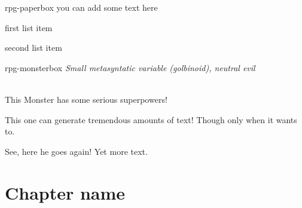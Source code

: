 \documentclass[10pt,twoside,twocolumn]{book}
\begin{document}
\begin{rpg-paperbox}{rpg-paperbox}
	you can add some text here
\end{rpg-paperbox}

\begin{rpg-list}
    \item first list item
    \item second list item
\end{rpg-list}
\begin{rpg-monsterbox}{rpg-monsterbox}
	\textit{Small metasyntatic variable (golbinoid), neutral evil}\\
	\hline
	\basics[%
	armorclass = 12,
	hitpoints  = 16 (3d8 + 3),
	speed      = 50 t
	]
	\hline
	\stats[ %
    STR = 12, 
    DEX = 7
	]
	\hline
	\details[%
	languages = {Common Lisp, Erlang},
	]
	\hline \\[1mm]
	\begin{rpg-monsteraction}
		This Monster has some serious superpowers!
	\end{rpg-monsteraction}

	\begin{rpg-monsteraction}
		This one can generate tremendous amounts of text! Though only when it wants to.
	\end{rpg-monsteraction}

	\begin{rpg-monsteraction}
    See, here he goes again! Yet more text.
	\end{rpg-monsteraction}
\end{rpg-monsterbox}

\chapter{Chapter name}

\end{document}
